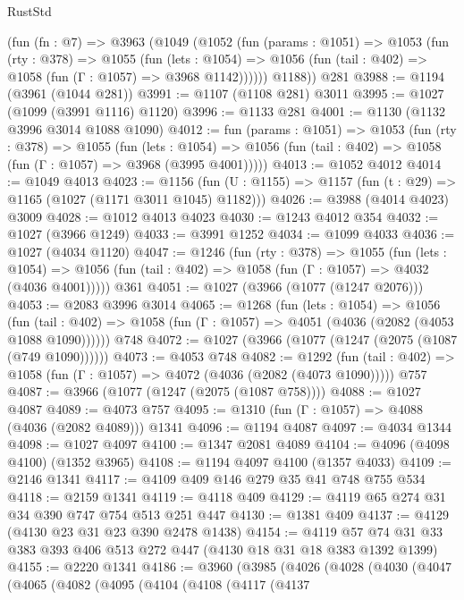 \begin{lexlean}{RustStd}
\begin{coremodule}
    (fun (fn : @7) =>
    @3963
      (@1049
        (@1052
          (fun (params : @1051) =>
          @1053
            (fun (rty : @378) =>
            @1055
              (fun (lets : @1054) =>
              @1056 (fun (tail : @402) => @1058 (fun (Γ : @1057) => @3968 @1142))))))
        @1188))
    @281
@3988 := @1194 (@3961 (@1044 @281))
@3991 := @1107 (@1108 @281) @3011
@3995 := @1027 (@1099 (@3991 @1116) @1120)
@3996 := @1133 @281
@4001 := @1130 (@1132 @3996 @3014 @1088 @1090)
@4012 := fun (params : @1051) =>
  @1053
    (fun (rty : @378) =>
    @1055
      (fun (lets : @1054) =>
      @1056 (fun (tail : @402) => @1058 (fun (Γ : @1057) => @3968 (@3995 @4001)))))
@4013 := @1052 @4012
@4014 := @1049 @4013
@4023 := @1156 (fun (U : @1155) => @1157 (fun (t : @29) => @1165 (@1027 (@1171 @3011 @1045) @1182)))
@4026 := @3988 (@4014 @4023) @3009
@4028 := @1012 @4013 @4023
@4030 := @1243 @4012 @354
@4032 := @1027 (@3966 @1249)
@4033 := @3991 @1252
@4034 := @1099 @4033
@4036 := @1027 (@4034 @1120)
@4047 := @1246
    (fun (rty : @378) =>
    @1055
      (fun (lets : @1054) =>
      @1056 (fun (tail : @402) => @1058 (fun (Γ : @1057) => @4032 (@4036 @4001)))))
    @361
@4051 := @1027 (@3966 (@1077 (@1247 @2076)))
@4053 := @2083 @3996 @3014
@4065 := @1268
    (fun (lets : @1054) =>
    @1056
      (fun (tail : @402) => @1058 (fun (Γ : @1057) => @4051 (@4036 (@2082 (@4053 @1088 @1090))))))
    @748
@4072 := @1027 (@3966 (@1077 (@1247 (@2075 (@1087 (@749 @1090))))))
@4073 := @4053 @748
@4082 := @1292
    (fun (tail : @402) => @1058 (fun (Γ : @1057) => @4072 (@4036 (@2082 (@4073 @1090)))))
    @757
@4087 := @3966 (@1077 (@1247 (@2075 (@1087 @758))))
@4088 := @1027 @4087
@4089 := @4073 @757
@4095 := @1310 (fun (Γ : @1057) => @4088 (@4036 (@2082 @4089))) @1341
@4096 := @1194 @4087
@4097 := @4034 @1344
@4098 := @1027 @4097
@4100 := @1347 @2081 @4089
@4104 := @4096 (@4098 @4100) (@1352 @3965)
@4108 := @1194 @4097 @4100 (@1357 @4033)
@4109 := @2146 @1341
@4117 := @4109 @409 @146 @279 @35 @41 @748 @755 @534
@4118 := @2159 @1341
@4119 := @4118 @409
@4129 := @4119 @65 @274 @31 @34 @390 @747 @754 @513 @251 @447
@4130 := @1381 @409
@4137 := @4129 (@4130 @23 @31 @23 @390 @2478 @1438)
@4154 := @4119 @57 @74 @31 @33 @383 @393 @406 @513 @272 @447 (@4130 @18 @31 @18 @383 @1392 @1399)
@4155 := @2220 @1341
@4186 := @3960
    (@3985
      (@4026
        (@4028
          (@4030
            (@4047
              (@4065
                (@4082
                  (@4095
                    (@4104
                      (@4108
                        (@4117
                          (@4137

\end{coremodule}
\end{lexlean}
